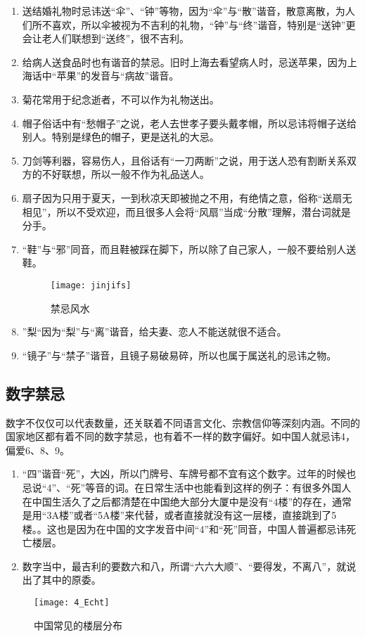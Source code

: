     \begin{enumerate}
   \item 
   送结婚礼物时忌讳送“伞”、“钟”等物，因为“伞”与“散”谐音，散意离散，为人们所不喜欢，所以伞被视为不吉利的礼物，“钟”与“终”谐音，特别是“送钟”更会让老人们联想到“送终”，很不吉利。
   \item
   给病人送食品时也有谐音的禁忌。旧时上海去看望病人时，忌送苹果，因为上海话中“苹果”的发音与“病故”谐音。
   \item
   菊花常用于纪念逝者，不可以作为礼物送出。
   \item
   帽子俗话中有“愁帽子”之说，老人去世孝子要头戴孝帽，所以忌讳将帽子送给别人。特别是绿色的帽子，更是送礼的大忌。
   \item
   刀剑等利器，容易伤人，且俗话有“一刀两断”之说，用于送人恐有割断关系双方的不好联想，所以一般不作为礼品送人。
   \item
   扇子因为只用于夏天，一到秋凉天即被抛之不用，有绝情之意，俗称“送扇无相见”，所以不受欢迎，而且很多人会将“风扇”当成“分散”理解，潜台词就是分手。
   \item
   “鞋”与“邪”同音，而且鞋被踩在脚下，所以除了自己家人，一般不要给别人送鞋。
   \begin{figure}[htb]
    \centering
    \texttt{[image: jinjifs]}
    \caption{禁忌风水}
    
    \end{figure}
   \item
   ”梨“因为“梨”与“离”谐音，给夫妻、恋人不能送就很不适合。
   \item
   “镜子”与“禁子”谐音，且镜子易破易碎，所以也属于属送礼的忌讳之物。
   
  
        
    \end{enumerate}


\subsection{数字禁忌}

    数字不仅仅可以代表数量，还关联着不同语言文化、宗教信仰等深刻内涵。不同的国家地区都有着不同的数字禁忌，也有着不一样的数字偏好。如中国人就忌讳4，偏爱6、8、9。
    \begin{enumerate}
    \item 
    “四”谐音“死”，大凶，所以门牌号、车牌号都不宜有这个数字。过年的时候也忌说“4”、“死”等音的词。在日常生活中也能看到这样的例子：有很多外国人在中国生活久了之后都清楚在中国绝大部分大厦中是没有“4楼”的存在，通常是用“3A楼”或者“5A楼”来代替，或者直接就没有这一层楼，直接跳到了5楼。。这也是因为在中国的文字发音中间“4”和“死”同音，中国人普遍都忌讳死亡楼层。
    \item 
    数字当中，最吉利的要数六和八，所谓“六六大顺”、“要得发，不离八”，就说出了其中的原委。　　
        
    \end{enumerate}
\begin{figure}[htb]
    \centering
    \texttt{[image: 4\_Echt]}
    \caption{中国常见的楼层分布}
\end{figure}


